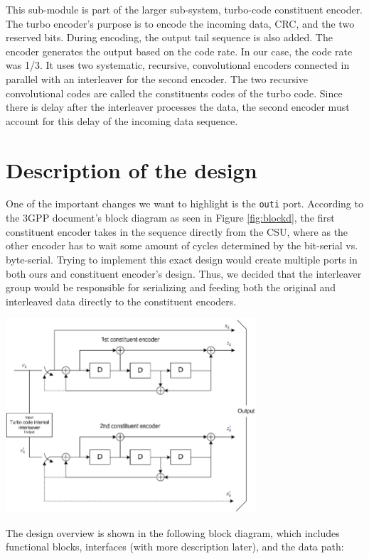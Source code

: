\documentclass[letterpaper, 12pt]{article} %
\begin{document}
        This sub-module is part of the larger sub-system, turbo-code constituent encoder. The turbo encoder's purpose is to encode the incoming data, CRC, and the two reserved bits. During encoding, the output tail sequence is also added. The encoder generates the output based on the code rate. In our case, the code rate was 1/3. It uses two systematic, recursive, convolutional encoders connected in parallel with an interleaver for the second encoder. The two recursive convolutional codes are called the constituents codes of the turbo code. Since there is delay after the interleaver processes the data, the second encoder must account for this delay of the incoming data sequence.
\section{Description of the design}
One of the important changes we want to highlight is the \texttt{outi} port. According to the 3GPP document's block diagram as seen in Figure \ref{fig:blockd}, the first constituent encoder takes in the sequence directly from the CSU, where as the other encoder has to wait some amount of cycles determined by the bit-serial vs. byte-serial. Trying to implement this exact design would create multiple ports in both ours and constituent encoder's design. Thus, we decided that the interleaver group would be responsible for serializing and feeding both the original and interleaved data directly to the constituent encoders.

\begin{center}
	\includegraphics[width=0.7\textwidth]{files/blockdiagram}
	\label{fig:blockd}
\end{center}

The design overview is shown in the following block diagram, which includes functional blocks, interfaces (with more description later), and the data path:
\end{document}
